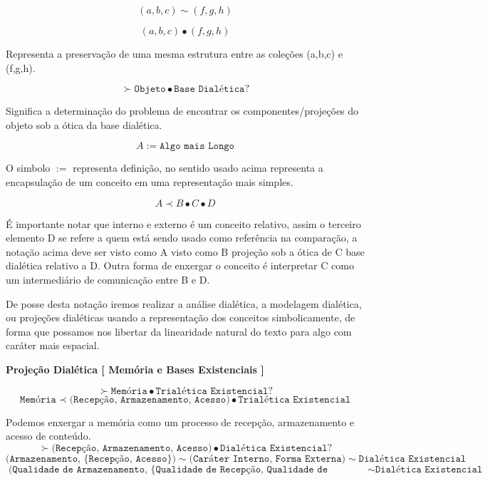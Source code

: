 $$ (a,b,c) \sim (f,g,h) $$ 

$$ (a,b,c) \bullet (f,g,h) $$

Representa a preservação de uma mesma estrutura entre as coleções (a,b,c) e (f,g,h).

$$ \succ \texttt{Objeto} \bullet \texttt{Base Dialética} ? $$

Significa a determinação do problema de encontrar os componentes/projeções do objeto sob a ótica da base dialética.

$$ A := \texttt{Algo mais Longo} $$

O simbolo $:=$ representa definição, no sentido usado acima representa a encapsulação de um conceito em uma representação mais simples.

$$ A \prec B \bullet C \bullet D $$

É importante notar que interno e externo é um conceito relativo, assim o terceiro elemento D se refere a quem está sendo usado como referência na comparação, a notação acima deve ser visto como A visto como B projeção sob a ótica de C base dialética relativo a D.  Outra forma de enxergar o conceito é interpretar C como um intermediário de comunicação entre B e D.

\hspace{\baselineskip}

De posse desta notação iremos realizar a análise dialética, a modelagem dialética, ou projeções dialéticas usando a representação dos conceitos simbolicamente, de forma que possamos nos libertar da linearidade natural do texto para algo com caráter mais espacial.

\hspace{\baselineskip}

\textbf{Projeção Dialética [ Memória e Bases Existenciais ]} 

$$ \succ \texttt{Memória} \bullet \texttt{Trialética Existencial} ? $$
$$ \texttt{Memória} \prec \texttt{(Recepção, Armazenamento, Acesso)} \bullet \texttt{Trialética Existencial} $$
\hrulefill

Podemos enxergar a memória como um processo de recepção, armazenamento e acesso de conteúdo.\\

$$ \succ \texttt{(Recepção, Armazenamento, Acesso)} \bullet \texttt{Dialética Existencial} ? $$
$$ \texttt{(Armazenamento, \{Recepção, Acesso\})} \sim \texttt{(Caráter Interno, Forma Externa)} \sim \texttt{Dialética Existencial} $$
$$ \texttt{(Qualidade de Armazenamento, \{Qualidade de Recepção, Qualidade de Acesso\})} \sim \texttt{Dialética Existencial} $$
\hrulefill

